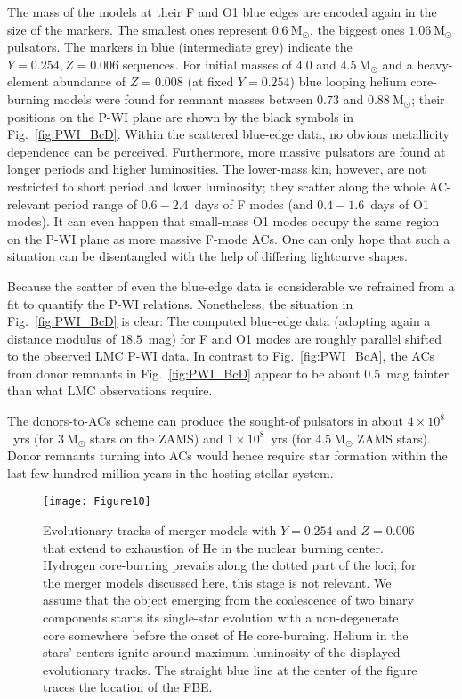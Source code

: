 \documentclass[a4paper,fleqn,usenatbib]{mnras}
\newcommand{\msol}{~\mathrm{M}_\odot}
\begin{document}
The mass of the models at their F and O1 blue edges are encoded again in the size of the markers. 
The smallest ones represent $0.6 \msol$, the biggest ones $1.06 \msol$ pulsators. The markers
in blue (intermediate grey) indicate the $Y=0.254, Z=0.006$ sequences. 
For initial masses of $4.0$ and $4.5 \msol$ 
and a heavy-element abundance of $Z=0.008$ (at fixed $Y=0.254$) blue looping 
helium core-burning models were found for remnant masses between $0.73$ and $0.88 \msol$; 
their positions on the P-WI plane are shown by the black symbols in Fig.~\ref{fig:PWI_BcD}. 
Within the scattered blue-edge data, no obvious metallicity dependence can be perceived.
Furthermore, more massive pulsators are found at longer periods and higher luminosities. The
lower-mass kin, however, are not restricted to short period and lower luminosity; they 
scatter along the whole AC-relevant period range of $0.6 - 2.4$~days of F modes 
(and $0.4 - 1.6$~days of O1 modes). It can even happen that small-mass O1 modes occupy 
the same region  on the P-WI plane as more massive F-mode ACs. 
One can only hope that such a situation  can be disentangled with the help of differing 
lightcurve shapes.    

Because the scatter of even the blue-edge data is considerable we refrained from a fit 
to quantify the P-WI relations. Nonetheless, the situation in 
Fig.~\ref{fig:PWI_BcD} is clear: The computed blue-edge data 
(adopting again a distance modulus of $18.5$~mag) for F and O1 modes 
are roughly parallel shifted to the observed LMC P-WI data. In contrast to Fig.~\ref{fig:PWI_BcA},
the ACs from donor remnants in Fig.~\ref{fig:PWI_BcD} appear to be about 0.5~mag fainter than what 
LMC observations require.

The donors-to-ACs scheme can produce the sought-of pulsators in about 
$4\times 10^{8}$~yrs (for $3 \msol$ stars on the ZAMS) and $1\times10^{8}$~yrs 
(for $4.5 \msol$ ZAMS stars). Donor remnants turning into ACs would hence require 
star formation within the last few hundred million years in the hosting stellar system. 

\begin{figure}
	\texttt{[image: Figure10]}
    \caption{Evolutionary tracks of merger models with $Y=0.254$ and $Z=0.006$ that extend 
    		 to exhaustion of He in the nuclear burning center. 
    		 Hydrogen core-burning prevails along the dotted part of the loci; 
             for the merger models discussed here, this stage is not relevant.
     		 We assume that the object emerging from the coalescence of two
     		 binary components starts its single-star evolution with a non-degenerate core  
     		 somewhere before the onset of He core-burning.
     		 Helium in the stars' centers ignite around maximum luminosity of the displayed 
     		 evolutionary tracks. The straight blue line at the center of the figure 
     		 traces the location of the FBE.    
    	    }
    \label{fig:hrd_merge}
\end{figure}
\end{document}
